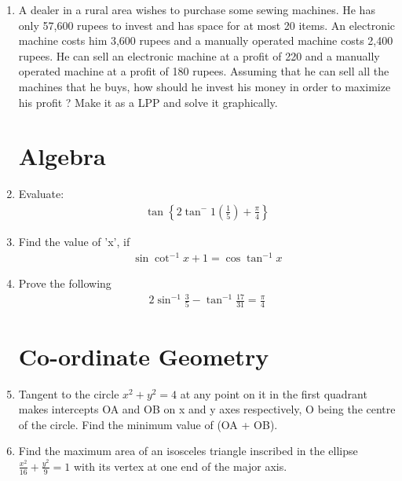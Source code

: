\documentclass[12pt,-letter paper]{article}
\providecommand{\cbrak}[1]{\ensuremath{\left\{#1\right\}}}
\providecommand{\brak}[1]{\ensuremath{\left(#1\right)}}
\providecommand{\brak}[1]{\ensuremath{\left(#1\right)}}
\begin{document}
\begin{enumerate}
 
    \item A dealer in a rural area wishes to purchase some sewing machines. He has only  57,600 rupees to invest and has space for at most 20 items. An electronic machine costs him 3,600 rupees and a manually operated machine costs 2,400 rupees. He can sell an electronic machine at a profit of 220 and a manually operated machine at a profit of 180 rupees. Assuming that he can sell all the machines that he buys, how should he invest his money in order to maximize his profit ? Make it as a LPP and solve it graphically.	

\section{Algebra}
	\item Evaluate:
    \begin{align*}
        \tan\cbrak{2\tan^-1{\brak{\frac{1}{5}}}+\frac{\pi}{4}}
    \end{align*}

	\item Find the value of 'x', if
 \begin{align*}
     \sin{\cot^{-1}{x+1}} = \cos{\tan^{-1}{x}}
 \end{align*}
 
	\item Prove the following
	\begin{align*}
		2\sin^{-1}{\frac{3}{5}}-\tan^{-1}{\frac{17}{31}} = \frac{\pi}{4}
	\end{align*}

\section{Co-ordinate Geometry}
    \item Tangent to the circle $x^2 + y^2 = 4$ at any point on it in the first quadrant makes intercepts OA and OB on x and y axes respectively, O being the centre of the circle. Find the minimum value of (OA + OB).
    \item Find the maximum area of an isosceles triangle inscribed in the ellipse $\frac{x^2}{16}+\frac{y^2}{9} = 1$ with its vertex at one end of the major axis.
\end{enumerate}
\end{document}
